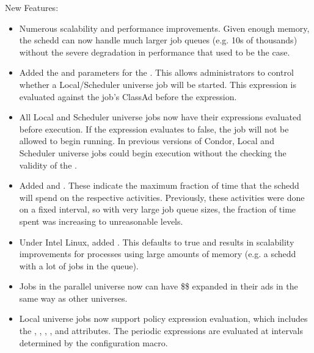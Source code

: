 \noindent New Features:

\begin{itemize}

\item Numerous scalability and performance improvements.  Given enough
memory, the schedd can now handle much larger job queues (e.g. 10s of
thousands) without the severe degradation in performance that used to
be the case.

\item Added the  and 
parameters for the . This allows administrators to control whether
a Local/Scheduler universe job will be started. This expression is evaluated
against the job's ClassAd before the  expression.

\item All Local and Scheduler universe jobs now have their  
expressions evaluated before execution. If the expression evaluates to false, the
job will not be allowed to begin running. In previous versions of Condor, Local 
and Scheduler universe jobs could begin execution without the  checking
the validity of the .

\item Added  and
.  These indicate the maximum
fraction of time that the schedd will spend on the respective
activities.  Previously, these activities were done on a fixed
interval, so with very large job queue sizes, the fraction of time
spent was increasing to unreasonable levels.

\item Under Intel Linux, added .
This defaults to true and results in scalability improvements for processes
using large amounts of memory (e.g. a schedd with a lot of jobs in the queue).

\item Jobs in the parallel universe now can have \$\$ expanded in their
ads in the same way as other universes.

\item Local universe jobs now support policy expression evaluation, which includes
the , , ,
, and  attributes. The periodic
expressions are evaluated at intervals determined by the
 configuration macro.


\end{itemize}
